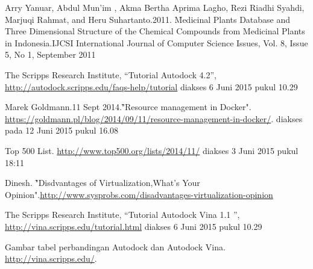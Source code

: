\begin{thebibliography}{4}
{Arry Yanuar, Abdul Mun’im , Akma Bertha Aprima Lagho, Rezi Riadhi Syahdi, Marjuqi Rahmat, and Heru Suhartanto.2011. \f{Medicinal Plants Database and Three Dimensional Structure of
		the Chemical Compounds from Medicinal Plants in Indonesia}.IJCSI International Journal of Computer Science Issues, Vol. 8, Issue 5, No 1, September 2011}

{The Scripps Research Institute, “Tutorial Autodock 4.2”,
	\url{http://autodock.scripps.edu/faqs-help/tutorial} diakses 6 Juni 2015 pukul
	10.29}

{Marek Goldmann.11 Sept 2014.\f{"Resource management in Docker"}. \url{https://goldmann.pl/blog/2014/09/11/resource-management-in-docker/}. diakses pada 12 Juni 2015 pukul 16.08}

{Top 500 List. \url{http://www.top500.org/lists/2014/11/} diakses 3 Juni 2015 pukul 18:11}

{Dinesh. \f{"Disdvantages of Virtualization,What's Your Opinion"}.\url{http://www.sysprobs.com/disadvantages-virtualization-opinion}}

{The Scripps Research Institute, “Tutorial Autodock Vina 1.1 ”,
	\url{http://vina.scripps.edu/tutorial.html} diakses 6 Juni 2015 pukul 10.29}

{Gambar tabel perbandingan Autodock dan Autodock Vina. \url{http://vina.scripps.edu/}.}

\end{thebibliography}



